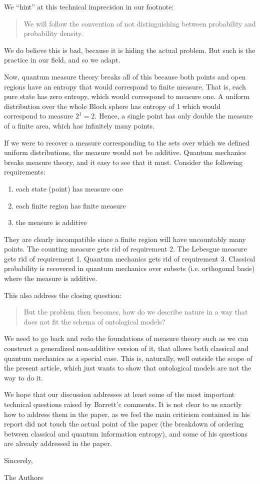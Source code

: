 \documentclass[11pt]{article}
\begin{document}
We ``hint'' at this technical imprecision in our footnote:
\begin{quote}
	We will follow the convention of not distinguishing between probability and probability density.
\end{quote}
We do believe this is bad, because it is hiding the actual problem. But such is the practice in our field, and so we adapt.

Now, quantum measure theory breaks all of this because both points and open regions have an entropy that would correspond to finite measure. That is, each pure state has zero entropy, which would correspond to measure one. A uniform distribution over the whole Bloch sphere has entropy of 1 which would correspond to measure $2^1 = 2$. Hence, a single point has only double the measure of a finite area, which has infinitely many points.

If we were to recover a measure corresponding to the sets over which we defined uniform distributions, the measure would not be additive. %
Quantum mechanics breaks measure theory, and it easy to see that it must. Consider the following requirements:
\begin{enumerate}
	\item each state (point) has measure one
	\item each finite region has finite measure
	\item the measure is additive
\end{enumerate}
They are clearly incompatible since a finite region will have uncountably many points. The counting measure gets rid of requirement 2. The Lebesgue measure gets rid of requirement 1. Quantum mechanics gets rid of requirement 3. Classical probability is recovered in quantum mechanics over subsets (i.e. orthogonal basis) where the measure is additive.

This also address the closing question:
\begin{quote}
But the problem then becomes,
how do we describe nature in a way that does not fit the schema of ontological
models?	
\end{quote}
We need to go back and redo the foundations of measure theory such as we can construct a generalized non-additive version of it, that allows both classical and quantum mechanics as a special case. This is, naturally, well outside the scope of the present article, which just wants to show that ontological models are not the way to do it.

We hope that our discussion addresses at least some of the most important technical questions raised by Barrett'c comments. It is not clear to us exactly how to address them in the paper, as we feel the main criticism contained in his report did not touch the actual point of the paper (the breakdown of ordering between classical and quantum information entropy), and some of his questions are already addressed in the paper.
\vspace{5mm}

Sincerely,
\vspace{5mm}


The Authors
\end{document}
